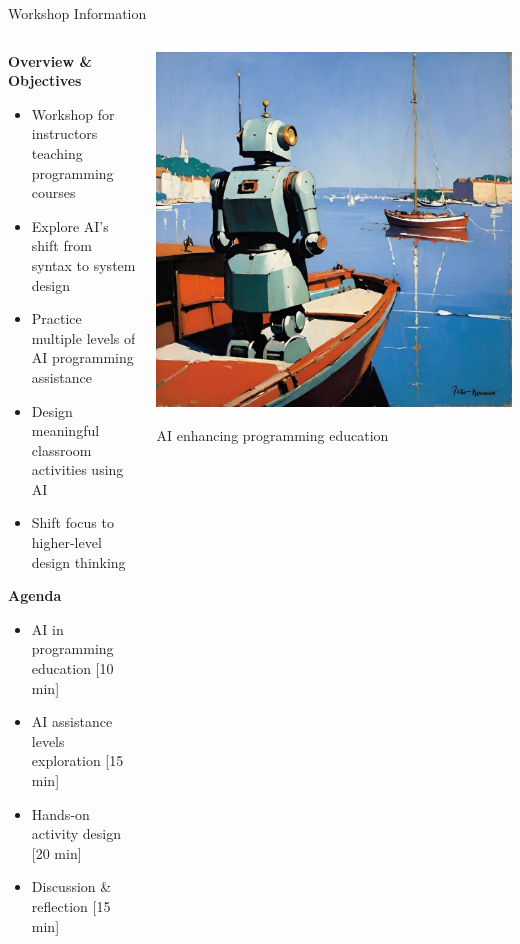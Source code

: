 \documentclass[xcolor=dvipsnames, aspectratio=169]{beamer}
\begin{document}
\begin{frame}{Workshop Information}
  \begin{columns}
    \begin{column}{0.58\textwidth}
      \textbf{Overview \& Objectives}
      \begin{itemize}\small
        \item Workshop for instructors teaching programming courses
        \item Explore AI's shift from syntax to system design
        \item Practice multiple levels of AI programming assistance
        \item Design meaningful classroom activities using AI
        \item Shift focus to higher-level design thinking
      \end{itemize}
      
      \textbf{Agenda}
      \begin{itemize}\small
        \item AI in programming education [10 min]
        \item AI assistance levels exploration [15 min]
        \item Hands-on activity design [20 min]
        \item Discussion \& reflection [15 min]
      \end{itemize}
    \end{column}
    
    \begin{column}{0.38\textwidth}
      \includegraphics[width=\textwidth]{images/ai_programming.jpeg}
      \vspace{0.2cm}
      \small\centerline{AI enhancing programming education}
    \end{column}
  \end{columns}
\end{frame}
\end{document}
